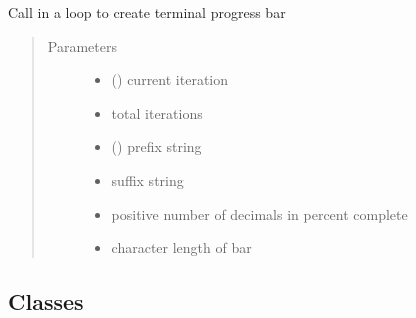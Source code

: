 \documentclass[a4paper,10pt,english]{sphinxmanual}
\begin{document}
\begin{fulllineitems}
\label{\detokenize{api/termtools.terminal.print_progress:termtools.terminal.print_progress}}
Call in a loop to create terminal progress bar
\begin{quote}\begin{description}
\item[{Parameters}] \leavevmode\begin{itemize}
\item {} 
 () \textendash{} current iteration

\item {} 
 \textendash{} total iterations

\item {} 
 () \textendash{} prefix string

\item {} 
 \textendash{} suffix string

\item {} 
 \textendash{} positive number of decimals in percent complete

\item {} 
 \textendash{} character length of bar

\end{itemize}

\end{description}\end{quote}

\end{fulllineitems}



\subsection{Classes}
\label{\detokenize{references:classes}}
\end{document}
